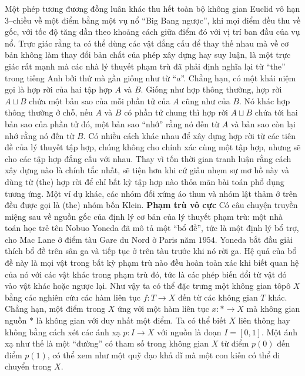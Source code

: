 \begin{multicols}{2}
\begin{figure}[H]
		\vspace*{-10pt}
	\end{figure}
	Một phép tương đương đồng luân khác thu hết toàn bộ không gian Euclid vô hạn $3$--chiều về một điểm bằng một vụ nổ ``Big Bang ngược'', khi mọi điểm đều thu về gốc, với tốc độ tăng dần theo khoảng cách giữa điểm đó với vị trí ban đầu của vụ nổ. 
	\vskip 0.1cm
	Trực giác rằng ta có thể dùng các vật đẳng cấu để thay thế nhau mà về cơ bản không làm thay đổi bản chất của phép xây dựng hay suy luận, là một trực giác rất mạnh mà các nhà lý thuyết phạm trù đã phải định nghĩa lại từ ``the'' trong tiếng Anh bởi thứ mà gần giống như từ ``$a$''. Chẳng hạn, có một khái niệm gọi là hợp rời của hai tập hợp $A$ và $B$. Giống như hợp thông thường, hợp rời $A \sqcup B$ chứa một bản sao của mỗi phần tử của $A$ cũng như của $B$. Nó khác hợp thông thường ở chỗ, nếu $A$ và $B$ có phần tử chung thì hợp rời $A \sqcup B$ chứa tới hai bản sao của phần tử đó, một bản sao ``nhớ'' rằng nó đến từ $A$ và bản sao còn lại nhớ rằng nó đến từ $B$.
	\vskip 0.1cm
	Có nhiều cách khác nhau để xây dựng hợp rời từ các tiên đề của lý thuyết tập hợp, chúng không cho chính xác cùng một tập hợp, nhưng sẽ cho các tập hợp đẳng cấu với nhau. Thay vì tốn thời gian tranh luận rằng cách xây dựng nào là chính tắc nhất, sẽ tiện hơn khi cứ giấu nhẹm sự mơ hồ này và dùng từ (the) hợp rời để chỉ bất kỳ tập hợp nào thỏa mãn bài toán phổ dụng tương ứng. Một ví dụ khác, các nhóm đối xứng áo thun và nhóm lật thảm ở trên đều được gọi là (the) nhóm bốn Klein.
	\vskip 0.1cm
	\textbf{\color{duongvaotoanhoc}Phạm trù vô cực}
	\vskip 0.1cm
	Có câu chuyện truyền miệng sau về nguồn gốc của định lý cơ bản của lý thuyết phạm trù: một nhà toán học trẻ tên Nobuo Yoneda đã mô tả một ``bổ đề'', tức là một định lý bổ trợ, cho Mac Lane ở điểm tàu Gare du Nord ở Paris năm $1954$. Yoneda bắt đầu giải thích bổ đề trên sân ga và tiếp tục ở trên tàu trước khi nó rời ga. Hệ quả của bổ đề này là mọi vật trong bất kỳ phạm trù nào đều hoàn toàn xác khi biết quan hệ của nó với các vật khác trong phạm trù đó, tức là các phép biến đổi từ vật đó vào vật khác hoặc ngược lại. Như vậy ta có thể đặc trưng một không gian tôpô $X$ bằng các nghiên cứu các hàm liên tục $f: T \to X$ đến từ các không gian $T$ khác. Chẳng hạn, một điểm trong $X$ ứng với một hàm liên tục $x: \ast \to X$ mà không gian nguồn $\ast$ là không gian với duy nhất một điểm. Ta có thể biết $X$ liên thông hay không bằng cách xét các ánh xạ $p: I \to X$ với nguồn là đoạn $I = [0,1]$. Một ánh xạ như thế là một ``đường'' có tham số trong không gian $X$ từ điểm $p(0)$ đến điểm $p(1)$, có thể xem như một quỹ đạo khả dĩ mà một con kiến có thể di chuyển trong $X$.

\end{multicols}
